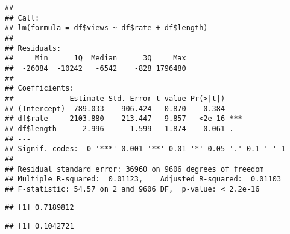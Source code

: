 \documentclass[
]{article}
\newenvironment{Shaded}{\begin{snugshade}}{\end{snugshade}}
\newcommand{\FunctionTok}[1]{\textcolor[rgb]{0.00,0.00,0.00}{#1}}
\newcommand{\NormalTok}[1]{#1}
\newcommand{\OtherTok}[1]{\textcolor[rgb]{0.56,0.35,0.01}{#1}}
\newcommand{\SpecialCharTok}[1]{\textcolor[rgb]{0.00,0.00,0.00}{#1}}
\begin{document}
\begin{Shaded}
\end{Shaded}

\begin{verbatim}
## 
## Call:
## lm(formula = df$views ~ df$rate + df$length)
## 
## Residuals:
##     Min      1Q  Median      3Q     Max 
##  -26084  -10242   -6542    -828 1796480 
## 
## Coefficients:
##             Estimate Std. Error t value Pr(>|t|)    
## (Intercept)  789.033    906.424   0.870    0.384    
## df$rate     2103.880    213.447   9.857   <2e-16 ***
## df$length      2.996      1.599   1.874    0.061 .  
## ---
## Signif. codes:  0 '***' 0.001 '**' 0.01 '*' 0.05 '.' 0.1 ' ' 1
## 
## Residual standard error: 36960 on 9606 degrees of freedom
## Multiple R-squared:  0.01123,    Adjusted R-squared:  0.01103 
## F-statistic: 54.57 on 2 and 9606 DF,  p-value: < 2.2e-16
\end{verbatim}

\begin{Shaded}
\end{Shaded}

\begin{verbatim}
## [1] 0.7189812
\end{verbatim}

\begin{Shaded}
\end{Shaded}

\begin{verbatim}
## [1] 0.1042721
\end{verbatim}

\begin{Shaded}
\end{Shaded}
\end{document}
